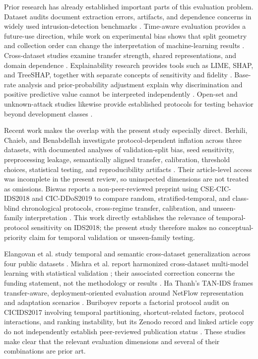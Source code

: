 \documentclass[preprint,12pt]{elsarticle}
\begin{document}
Prior research has already established important parts of this evaluation problem. Dataset audits document extraction errors, artifacts, and dependence concerns in widely used intrusion-detection benchmarks \cite{engelen2021troubleshooting,arp2022dos}. Time-aware evaluation provides a future-use direction, while work on experimental bias shows that split geometry and collection order can change the interpretation of machine-learning results \cite{pendlebury2019tesseract}. Cross-dataset studies examine transfer strength, shared representations, and domain dependence \cite{dhooge2020interdataset,layeghy2023crossdomain,cantone2024crossdataset}. Explainability research provides tools such as LIME, SHAP, and TreeSHAP, together with separate concepts of sensitivity and fidelity \cite{ribeiro2016lime,lundberg2017shap,lundberg2020trees,yeh2019infidelity}. Base-rate analysis and prior-probability adjustment explain why discrimination and positive predictive value cannot be interpreted independently \cite{axelsson2000baserate,saerens2002prior}. Open-set and unknown-attack studies likewise provide established protocols for testing behavior beyond development classes \cite{scheirer2013openset,zoppi2023unknown,shin2023openset}.

Recent work makes the overlap with the present study especially direct. Berhili, Chaieb, and Benabdellah investigate protocol-dependent inflation across three datasets, with documented analyses of validation-split bias, seed sensitivity, preprocessing leakage, semantically aligned transfer, calibration, threshold choices, statistical testing, and reproducibility artifacts \cite{berhili2026protocol,berhili2026reproducibility}. Their article-level access was incomplete in the present review, so uninspected dimensions are not treated as omissions. Biswas reports a non-peer-reviewed preprint using CSE-CIC-IDS2018 and CIC-DDoS2019 to compare random, stratified-temporal, and class-blind chronological protocols, cross-regime transfer, calibration, and unseen-family interpretation \cite{biswas2026drift}. This work directly establishes the relevance of temporal-protocol sensitivity on IDS2018; the present study therefore makes no conceptual-priority claim for temporal validation or unseen-family testing.

Elangovan et al. study temporal and semantic cross-dataset generalization across four public datasets \cite{elangovan2026crossdataset}. Mishra et al. report harmonized cross-dataset multi-model learning with statistical validation \cite{mishra2026harmonized}; their associated correction concerns the funding statement, not the methodology or results \cite{mishra2026correction}. Ha Thanh's TAN-IDS frames transfer-aware, deployment-oriented evaluation around NetFlow representation and adaptation scenarios \cite{hathanh2026tanids}. Buriboyev reports a factorial protocol audit on CICIDS2017 involving temporal partitioning, shortcut-related factors, protocol interactions, and ranking instability, but its Zenodo record and linked article copy do not independently establish peer-reviewed publication status \cite{buriboyev2026protocol}. These studies make clear that the relevant evaluation dimensions and several of their combinations are prior art.
\end{document}
